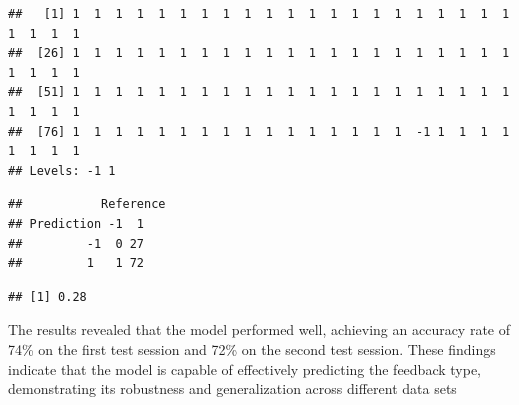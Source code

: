 \documentclass[
]{article}
\newenvironment{Shaded}{\begin{snugshade}}{\end{snugshade}}
\newcommand{\DecValTok}[1]{\textcolor[rgb]{0.00,0.00,0.81}{#1}}
\newcommand{\DocumentationTok}[1]{\textcolor[rgb]{0.56,0.35,0.01}{\textbf{\textit{#1}}}}
\newcommand{\FunctionTok}[1]{\textcolor[rgb]{0.13,0.29,0.53}{\textbf{#1}}}
\newcommand{\NormalTok}[1]{#1}
\newcommand{\OtherTok}[1]{\textcolor[rgb]{0.56,0.35,0.01}{#1}}
\newcommand{\SpecialCharTok}[1]{\textcolor[rgb]{0.81,0.36,0.00}{\textbf{#1}}}
\begin{document}
\begin{verbatim}
##   [1] 1  1  1  1  1  1  1  1  1  1  1  1  1  1  1  1  1  1  1  1  1  1  1  1  1 
##  [26] 1  1  1  1  1  1  1  1  1  1  1  1  1  1  1  1  1  1  1  1  1  1  1  1  1 
##  [51] 1  1  1  1  1  1  1  1  1  1  1  1  1  1  1  1  1  1  1  1  1  1  1  1  1 
##  [76] 1  1  1  1  1  1  1  1  1  1  1  1  1  1  1  1  -1 1  1  1  1  1  1  1  1 
## Levels: -1 1
\end{verbatim}

\begin{Shaded}
\end{Shaded}

\begin{verbatim}
##           Reference
## Prediction -1  1
##         -1  0 27
##         1   1 72
\end{verbatim}

\begin{Shaded}
\end{Shaded}

\begin{verbatim}
## [1] 0.28
\end{verbatim}

The results revealed that the model performed well, achieving an
accuracy rate of 74\% on the first test session and 72\% on the second
test session. These findings indicate that the model is capable of
effectively predicting the feedback type, demonstrating its robustness
and generalization across different data sets
\end{document}
